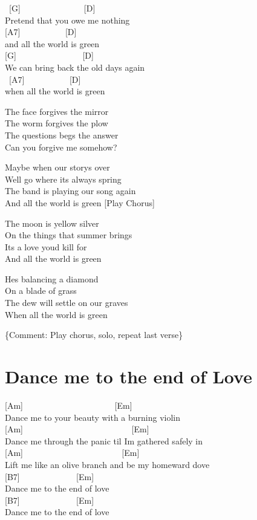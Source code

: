 \documentclass[
  letterpaper,
]{scrbook}
\begin{document}
~{[}G{]} ~ ~ ~ ~ ~ ~ ~ ~ ~{[}D{]}\\
Pretend that you owe me nothing ~ ~ ~\\
\hspace*{0.333em} {[}A7{]} ~ ~ ~ ~ ~ ~ {[}D{]}\\
and all the world is green\\
{[}G{]} ~ ~ ~ ~ ~ ~ ~ ~ ~ {[}D{]} ~ ~ ~ ~\\
We can bring back the old days again ~ ~\\
\hspace*{0.333em} ~{[}A7{]} ~ ~ ~ ~ ~ ~ {[}D{]}\\
when all the world is green

The face forgives the mirror\\
The worm forgives the plow\\
The questions begs the answer\\
Can you forgive me somehow?

Maybe when our story\textquotesingle s over\\
We\textquotesingle ll go where it\textquotesingle s always spring\\
The band is playing our song again\\
And all the world is green {[}Play Chorus{]}

The moon is yellow silver\\
On the things that summer brings\\
It\textquotesingle s a love you\textquotesingle d kill for\\
And all the world is green

He\textquotesingle s balancing a diamond\\
On a blade of grass\\
The dew will settle on our graves\\
When all the world is green

\{Comment: Play chorus, solo, repeat last verse\}

\hypertarget{dance-me-to-the-end-of-love}{%
\chapter{Dance me to the end of
Love}\label{dance-me-to-the-end-of-love}}

{[}Am{]} ~ ~ ~ ~ ~ ~ ~ ~ ~ ~ ~ ~ ~{[}Em{]}\\
Dance me to your beauty with a burning violin\\
{[}Am{]} ~ ~ ~ ~ ~ ~ ~ ~ ~ ~ ~ ~ ~ ~ ~ {[}Em{]}\\
Dance me through the panic \textquotesingle til I\textquotesingle m
gathered safely in\\
{[}Am{]} ~ ~ ~ ~ ~ ~ ~ ~ ~ ~ ~ ~ ~ ~{[}Em{]}\\
Lift me like an olive branch and be my homeward dove\\
{[}B7{]} ~ ~ ~ ~ ~ ~ ~ ~{[}Em{]}\\
Dance me to the end of love\\
{[}B7{]} ~ ~ ~ ~ ~ ~ ~ ~{[}Em{]}\\
Dance me to the end of love
\end{document}
